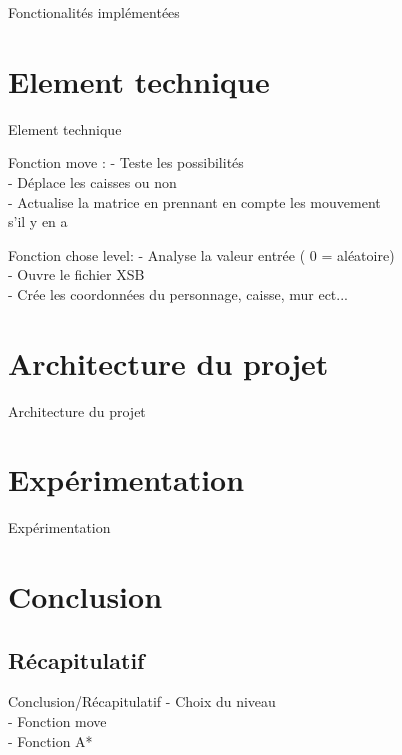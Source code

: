 \documentclass{beamer}
\begin{document}
\begin{frame}{Fonctionalités implémentées}

\end{frame}
\section{Element technique}
\begin{frame}{Element technique}

\begin{block}{Fonction move :} 
- Teste les possibilités \\
- Déplace les caisses ou non \\
- Actualise la matrice en prennant en compte les mouvement \\ s'il y en a \\
\end{block}
\begin{block}{Fonction chose level:} 
- Analyse la valeur entrée ( 0 = aléatoire) \\
- Ouvre le fichier XSB  \\
- Crée les coordonnées du personnage, caisse, mur ect... 
\end{block}
\end{frame}

\section{Architecture du projet}
\begin{frame}{Architecture du projet}

\end{frame}

\section{Expérimentation}
\begin{frame}{Expérimentation}

\end{frame}


\section{Conclusion}
\subsection{Récapitulatif}
\begin{frame}{Conclusion/Récapitulatif}
- Choix du niveau \\
- Fonction move \\
- Fonction A*  \\

\end{frame}
\end{document}
